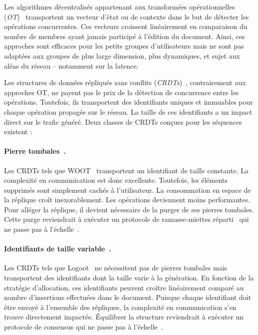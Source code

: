 Les algorithmes décentralisés appartenant aux transformées opérationnelles
(\emph{OT})~\cite{sun1998operational, sun2009contextbased} transportent un
vecteur d'état ou de contexte dans le but de détecter les opérations
concurrentes. Ces vecteurs croissent linéairement en comparaison du nombre de
membres ayant jamais participé à l'édition du document. Ainsi, ces approches
sont efficaces pour les petits groupes d'utilisateurs mais ne sont pas adaptées
aux groupes de plus large dimension, plus dynamiques, et sujet aux aléas du
réseau -- notamment sur la latence.

Les structures de données répliqués sans  conflits
(\emph{CRDTs})~\cite{burckhardt2014replicated, shapiro2011comprehensive,
shapiro2011conflict}, contrairement aux approches OT, ne payent pas le prix de
la détection de concurrence entre les opérations. Toutefois, ils transportent
des identifiants uniques et immuables pour chaque opération propagée sur le
réseau. La taille de ces identifiants a un impact direct sur le trafic généré.
Deux classes de CRDTs conçues pour les séquences existent :

\paragraph{Pierre tombales~\cite{ahmed2011evaluating, attiya2016specification,
conway2014language, grishchenko2010deep, oster2006data, roh2011replicated,
weiss2007wooki, wu2010partial, yu2012stringwise}.} Les CRDTs tels que
WOOT~\cite{oster2006data} transportent un identifiant de taille constante. La
complexité en communication est donc excellente. Toutefois, les éléments
supprimés sont simplement cachés à l'utilisateur. La consommation en espace de
la réplique croît inexorablement. Les opérations deviennent moins
performantes. Pour alléger la réplique, il devient nécessaire de la purger de
ses pierres tombales. Cette purge reviendrait à exécuter un protocole de
ramasse-miettes réparti~\cite{abdullahi1998garbage} qui ne passe pas à
l'échelle~\cite{abdullahi1998garbage}.

\paragraph{Identifiants de taille variable~\cite{andre2013supporting,
 preguica2009commutative, weiss2009logoot}.} Les CRDTs tels que
Logoot~\cite{weiss2009logoot} ne nécessitent pas de pierres tombales mais
transportent des identifiants dont la taille varie à la génération. En fonction
de la stratégie d'allocation, ces identifiants peuvent croître linéairement
comparé au nombre d'insertions effectuées dans le document. Puisque chaque
identifiant doit être envoyé à l'ensemble des répliques, la complexité en
communication s'en trouve directement impactée.  Équilibrer la structure
reviendrait à exécuter un protocole de consensus qui ne passe pas à
l'échelle~\cite{mostefaoui2015signature}.

